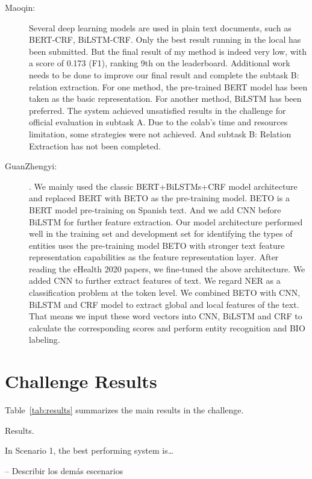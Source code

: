 \documentclass[a4paper,11pt,twocolumn,twoside]{article}
\begin{document}
\begin{description}
  \item[Maoqin:]  Several deep learning models are used in plain text documents, such as
  BERT-CRF, BiLSTM-CRF. Only the best result running in the local has been submitted. But the final
  result of my method is indeed very low, with a score of 0.173 (F1), ranking 9th on the leaderboard.
  Additional work needs to be done to improve our final result and complete the subtask B: relation
  extraction. For one method, the pre-trained BERT model has been taken as the basic representation.
  For another method, BiLSTM has been preferred. The system achieved unsatisfied results in the
  challenge for official evaluation in subtask A. Due to the colab’s time and resources limitation,
  some strategies were not achieved. And subtask B: Relation Extraction has not been completed.

  \item [GuanZhengyi:] . We mainly used the classic BERT+BiLSTMs+CRF model architecture and replaced BERT
  with BETO as the pre-training model. BETO is a BERT model pre-training on Spanish text. And we
  add CNN before BiLSTM for further feature extraction. Our model architecture performed well in the
  training set and development set for identifying the types of entities
  uses the pre-training model BETO with stronger text feature
  representation capabilities as the feature representation layer. After reading the eHealth 2020
  papers, we fine-tuned the above architecture. We added CNN to further extract features of
  text. We regard NER as a classification problem at the token level. We combined BETO with
  CNN, BiLSTM and CRF model to extract global and local features of the text. That means we
  input these word vectors into CNN, BiLSTM and CRF to calculate the corresponding scores and
  perform entity recognition and BIO labeling.
\end{description}

\section{Challenge Results}\label{sec:results}

Table~\ref{tab:results} summarizes the main results in the challenge.

\begin{table}
  \caption{Results.\label{tab:results}}
\end{table}

In Scenario 1, the best performing system is\dots

-- Describir los demás escenarios
\end{document}
